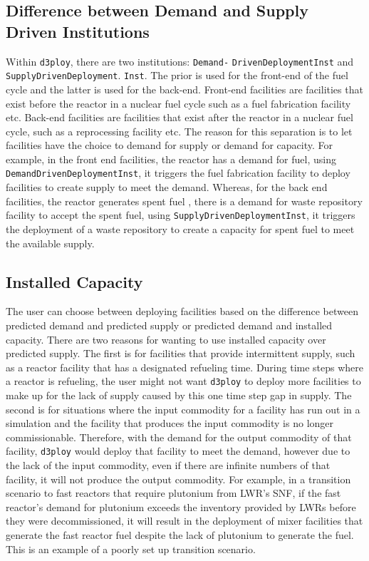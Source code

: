 \documentclass{anstrans}
\newcommand{\deploy}{\texttt{d3ploy}\xspace}%
\begin{document}
\subsection{\textbf{Difference between Demand and Supply Driven Institutions}}
Within \deploy, there are two institutions: \texttt{Demand-}
\texttt{DrivenDeploymentInst} and \texttt{SupplyDrivenDeployment}. 
\texttt{Inst}. 
The prior is used for the front-end of the fuel cycle and the latter is used 
for the back-end. 
Front-end facilities are facilities that exist before the reactor 
in a nuclear fuel cycle such as a fuel fabrication facility etc. 
Back-end facilities are facilities that exist after the reactor in a nuclear 
fuel cycle, such as a reprocessing facility etc. 
The reason for this separation is to let facilities have the choice 
to demand for supply or demand for capacity. 
For example, in the front end facilities, the reactor has a demand for 
fuel, using \texttt{DemandDrivenDeploymentInst}, it triggers the fuel 
fabrication facility to deploy facilities to create supply to meet 
the demand. 
Whereas, for the back end facilities, the reactor generates spent fuel 
, there is a demand for waste repository facility to accept the 
spent fuel, using \texttt{SupplyDrivenDeploymentInst}, it triggers the
deployment of a waste repository to create a capacity for spent fuel 
to meet the available supply. 

\subsection{\textbf{Installed Capacity}}
The user can choose between deploying facilities based on the difference 
between predicted demand and predicted supply or predicted demand and 
installed capacity. 
There are two reasons for wanting to use installed capacity over predicted 
supply. 
The first is for facilities that provide intermittent supply, such as a 
reactor facility that has a designated refueling time. 
During time steps where a reactor is refueling, the user might not 
want \deploy to deploy more facilities to make up for the lack of supply
caused by this one time step gap in supply. 
The second is for situations where the input commodity for a facility has
run out in a simulation and the facility that produces the input commodity 
is no longer commissionable. 
Therefore, with the demand for the output commodity of that facility, \deploy
would deploy that facility to meet the demand, however due to the lack of 
the input commodity, even if there are infinite numbers of that facility, 
it will not produce the output commodity. 
For example, in a transition scenario to fast reactors that require plutonium 
from \gls{LWR}'s \gls{SNF}, if the fast reactor's demand for plutonium exceeds
the inventory provided by \gls{LWR}s before they were decommissioned, it will 
result in the deployment of mixer facilities that generate the fast reactor 
fuel despite the lack of plutonium to generate the fuel. 
This is an example of a poorly set up transition scenario. 
\end{document}
